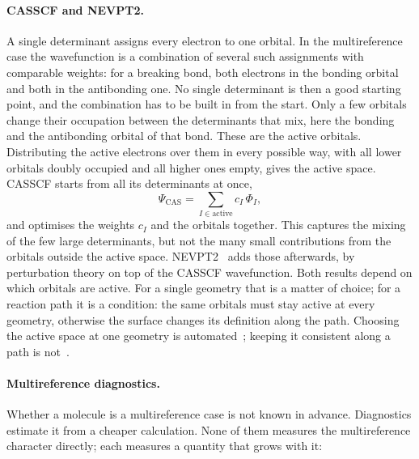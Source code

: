 \paragraph{CASSCF and NEVPT2.} A single determinant assigns every
electron to one orbital. In the multireference case the wavefunction
is a combination of several such assignments with comparable weights:
for a breaking bond, both electrons in the bonding orbital and both in
the antibonding one. No single determinant is then a good starting
point, and the combination has to be built in from the start. Only a
few orbitals change their occupation between the determinants that
mix, here the bonding and the antibonding orbital of that bond. These
are the active orbitals. Distributing the active electrons over them
in every possible way, with all lower orbitals doubly occupied and all
higher ones empty, gives the active space. CASSCF starts from all its
determinants at once,
%
\begin{equation}
  \Psi_\text{CAS} = \sum_{I \in \text{active}} c_I \,\Phi_I ,
\end{equation}
%
and optimises the weights $c_I$ and the orbitals together. This
captures the mixing of the few large determinants, but not the many
small contributions from the orbitals outside the active space.
NEVPT2~\cite{angeli2001} adds those afterwards, by perturbation theory
on top of the CASSCF wavefunction. Both results depend on which
orbitals are active. For a single geometry that is a
matter of choice; for a reaction path it is a condition: the same orbitals
must stay active at every geometry, otherwise the surface changes its
definition along the path. Choosing the active space at one geometry is
automated~\cite{sayfutyarova2017, stein2019autocas}; keeping it consistent
along a path is not~\cite{bensberg2023, seal2025wasp}.

\paragraph{Multireference diagnostics.} Whether a molecule is a
multireference case is not known in advance. Diagnostics estimate it from
a cheaper calculation. None of them measures the multireference character
directly; each measures a quantity that grows with it:


